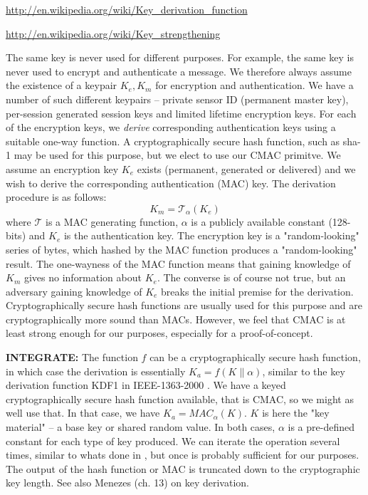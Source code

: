 \url{http://en.wikipedia.org/wiki/Key_derivation_function}

\url{http://en.wikipedia.org/wiki/Key_strengthening}

The same key is never used for different purposes. For example, the same key is never used to encrypt and authenticate a message. We therefore always assume the existence of a keypair $K_e,K_m$ for encryption and authentication.
%
We have a number of such different keypairs -- private sensor ID (permanent master key), per-session generated session keys and limited lifetime encryption keys. For each of the encryption keys, we \textit{derive} corresponding authentication keys using a suitable one-way function. A cryptographically secure hash function, such as sha-1 \cite{} may be used for this purpose, but we elect to use our CMAC primitve. We assume an encryption key $K_e$ exists (permanent, generated or delivered) and we wish to derive the corresponding authentication (MAC) key. The derivation procedure is as follows:
\[
K_m = \mathcal{T}_\alpha(K_e)
\]
where $\mathcal{T}$ is a MAC generating function, $\alpha$ is a publicly available constant (128-bits) and $K_e$ is the authentication key. The encryption key is a "random-looking" series of bytes, which hashed by the MAC function produces a "random-looking" result. The one-wayness of the MAC function means that gaining knowledge of $K_m$ gives no information about $K_e$. The converse is of course not true, but an adversary gaining knowledge of $K_e$ breaks the initial premise for the derivation. Cryptographically secure hash functions are usually used for this purpose and are cryptographically more sound than MACs. However, we feel that CMAC is at least strong enough for our purposes, especially for a proof-of-concept.

\textbf{INTEGRATE:}
The function $f$ can be a cryptographically secure hash function, in which case the derivation is essentially $K_a = f(K \parallel \alpha)$, similar to the key derivation function KDF1 in IEEE-1363-2000 \cite{ieee-1363-2000}. We have a keyed cryptographically secure hash function available, that is CMAC, so we might as well use that. In that case, we have $K_a = MAC_{\alpha}(K)$. $K$ is here the "key material" -- a base key or shared random value. In both cases, $\alpha$ is a pre-defined constant for each type of key produced. We can iterate the operation several times, similar to whats done in , but once is probably sufficient for our purposes. The output of the hash function or MAC is truncated down to the cryptographic key length. See also Menezes (ch. 13) on key derivation.

